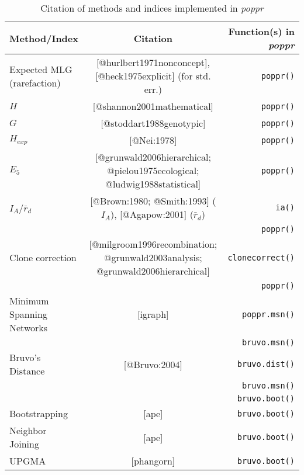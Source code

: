 \begin{sidewaystable}[ph!]
\begin{tabular}{lcr}
\hline
Method/Index & Citation & Function(s) in \textit{poppr} \\  
\hline
Expected MLG (rarefaction) & [@hurlbert1971nonconcept], [@heck1975explicit] (for std. err.) & \texttt{poppr()} \\ 
\hline
$H$ & [@shannon2001mathematical] & \texttt{poppr()} \\
\hline
$G$ & [@stoddart1988genotypic] & \texttt{poppr()} \\
\hline
$H_{exp}$ & [@Nei:1978] & \texttt{poppr()} \\
\hline
$E_{5}$ & [@grunwald2006hierarchical; @pielou1975ecological; @ludwig1988statistical] & \texttt{poppr()} \\
\hline
$I_A$/$\bar{r}_d$ & [@Brown:1980; @Smith:1993] ($I_A$), [@Agapow:2001] ($\bar{r}_d$) & \texttt{ia()} \\
 & & \texttt{poppr()} \\
\hline
Clone correction & [@milgroom1996recombination; @grunwald2003analysis; @grunwald2006hierarchical] & \texttt{clonecorrect()} \\
 & & \texttt{poppr()}\\
\hline
\hline
Minimum Spanning Networks & [igraph] & \texttt{poppr.msn()} \\
 & & \texttt{bruvo.msn()} \\
Bruvo's Distance & [@Bruvo:2004] & \texttt{bruvo.dist()} \\
 & & \texttt{bruvo.msn()} \\
 & & \texttt{bruvo.boot()} \\
\hline
Bootstrapping & [ape] & \texttt{bruvo.boot()} \\
\hline
Neighbor Joining & [ape] & \texttt{bruvo.boot()} \\
\hline
UPGMA & [phangorn] & \texttt{bruvo.boot()} \\
\hline
\end{tabular}
\caption{Citation of methods and indices implemented in \textit{poppr}}
\label{tab:poppr4}
\end{sidewaystable}